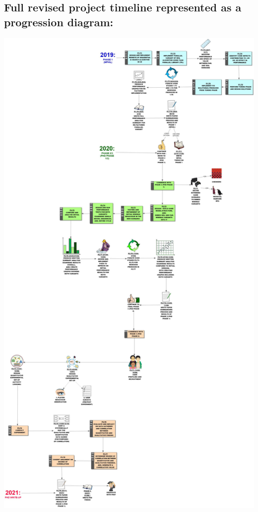 \documentclass[12pt]{article}
\begin{document}
\subsection{Full revised project timeline represented as a progression diagram:}
\begin{flushleft}
   \includegraphics[width=0.8\linewidth]{phd_plan_july19.jpg}
\end{flushleft}
\end{document}
